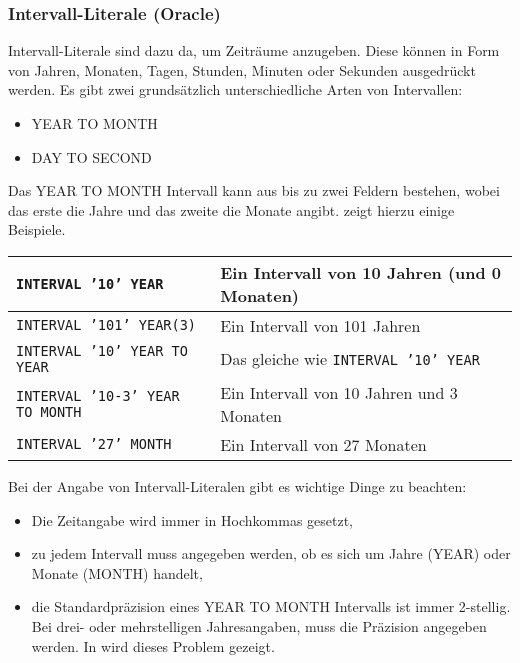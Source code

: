 \subsubsection{Intervall-Literale (Oracle)}
Intervall-Literale sind dazu da, um Zeiträume anzugeben. Diese
können in Form von Jahren, Monaten, Tagen, Stunden, Minuten oder
Sekunden ausgedrückt werden. Es gibt zwei grundsätzlich
unterschiedliche Arten von Intervallen:
\begin{itemize}
    \item YEAR TO MONTH
    \item DAY TO SECOND
\end{itemize}
Das YEAR TO MONTH Intervall kann aus bis zu zwei Feldern bestehen,
wobei das erste die Jahre und das zweite die Monate angibt.
 zeigt hierzu einige Beispiele.
\begin{center}
    \label{yeartomonth}
    \begin{small}
        \tabletail{
            \hline
        }
        \tablelasttail{
            \hline
        }
        \begin{supertabular}{|l|p{9cm}|}
            \texttt{INTERVAL '10' YEAR} & Ein Intervall von 10 Jahren (und 0 Monaten) \\
            \hline
            \texttt{INTERVAL '101' YEAR(3)} & Ein Intervall von 101 Jahren \\
            \hline
            \texttt{INTERVAL '10' YEAR TO YEAR} & Das gleiche wie \texttt{INTERVAL '10' YEAR} \\
            \hline
            \texttt{INTERVAL '10-3' YEAR TO MONTH} & Ein Intervall von 10 Jahren und 3 Monaten \\
            \hline
            \texttt{INTERVAL '27' MONTH} & Ein Intervall von 27 Monaten \\
        \end{supertabular}
    \end{small}
\end{center}
Bei der Angabe von Intervall-Literalen gibt es wichtige Dinge zu
beachten:
\begin{itemize}
    \item Die Zeitangabe wird immer in Hochkommas gesetzt,
    \item zu jedem Intervall muss angegeben werden, ob es sich um Jahre (YEAR) oder Monate (MONTH) handelt,
    \item die Standardpräzision eines YEAR TO MONTH Intervalls ist immer 2-stellig. Bei drei- oder mehrstelligen Jahresangaben, muss die Präzision angegeben werden. In  wird dieses Problem gezeigt.
\end{itemize}
